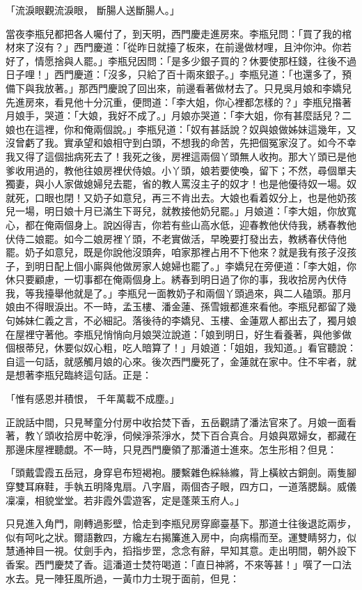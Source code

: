 「流淚眼觀流淚眼，  斷腸人送斷腸人。」

當夜李瓶兒都把各人囑付了，到天明，西門慶走進房來。李瓶兒問：「買了我的棺材來了沒有？」西門慶道：「從昨日就擡了板來，在前邊做材哩，且沖你沖。你若好了，情愿捨與人罷。」李瓶兒因問：「是多少銀子買的？休要使那枉錢，往後不過日子哩！」西門慶道：「沒多，只給了百十兩來銀子。」李瓶兒道：「也還多了，預備下與我放著。」那西門慶說了回出來，前邊看著做材去了。只見吳月娘和李嬌兒先進房來，看見他十分沉重，便問道：「李大姐，你心裡都怎樣的？」李瓶兒揝著月娘手，哭道：「大娘，我好不成了。」月娘亦哭道：「李大姐，你有甚麼話兒？二娘也在這裡，你和俺兩個說。」李瓶兒道：「奴有甚話說？奴與娘做姊妹這幾年，又沒曾虧了我。實承望和娘相守到白頭，不想我的命苦，先把個冤家沒了。如今不幸我又得了這個拙病死去了！我死之後，房裡這兩個丫頭無人收拘。那大丫頭已是他爹收用過的，教他往娘房裡伏侍娘。小丫頭，娘若要使喚，留下；不然，尋個單夫獨妻，與小人家做媳婦兒去罷，省的教人罵沒主子的奴才！也是他優待奴一場。奴就死，口眼也閉！又奶子如意兒，再三不肯出去。大娘也看着奴分上，也是他奶孩兒一場，明日娘十月已滿生下哥兒，就教接他奶兒罷。」月娘道：「李大姐，你放寬心，都在俺兩個身上。說凶得吉，你若有些山高水低，迎春教他伏侍我，綉春教他伏侍二娘罷。如今二娘房裡丫頭，不老實做活，早晚要打發出去，教綉春伏侍他罷。奶子如意兒，既是你說他沒頭奔，咱家那裡占用不下他來？就是我有孩子沒孩子，到明日配上個小廝與他做房家人媳婦也罷了。」李嬌兒在旁便道：「李大姐，你休只要顧慮，一切事都在俺兩個身上。綉春到明日過了你的事，我收拾房內伏侍我，等我擡舉他就是了。」李瓶兒一面教奶子和兩個丫頭過來，與二人磕頭。那月娘由不得眼淚出。不一時，孟玉樓、潘金蓮、孫雪娥都進來看他。李瓶兒都留了幾句姊妹仁義之言，不必細記。落後待的李嬌兒、玉樓、金蓮眾人都出去了，獨月娘在屋裡守著他。李瓶兒悄悄向月娘哭泣說道：「娘到明日，好生看養著，與他爹做個根蒂兒，休要似奴心粗，吃人暗算了！」月娘道：「姐姐，我知道。」看官聽說：自這一句話，就感觸月娘的心來。後次西門慶死了，金蓮就在家中。住不牢者，就是想著李瓶兒臨終這句話。正是：

「惟有感恩并積恨，  千年萬載不成塵。」

正說話中間，只見琴童分付房中收拾焚下香，五岳觀請了潘法官來了。月娘一面看著，教丫頭收拾房中乾淨，伺候淨茶淨水，焚下百合真合。月娘與眾婦女，都藏在那邊床屋裡聽覷。不一時，只見西門慶領了那潘道士進來。怎生形相？但見：

「頭戴雲霞五岳冠，身穿皂布短褐袍。腰繫雜色綵絲縧，背上橫紋古銅劍。兩隻腳穿雙耳麻鞋，手執五明降鬼扇。八字眉，兩個杏子眼，四方口，一道落腮鬍。威儀凜凜，相貌堂堂。若非霞外雲遊客，定是蓬萊玉府人。」

只見進入角門，剛轉過影壁，恰走到李瓶兒房穿廊臺基下。那道士往後退訖兩步，似有呵叱之狀。爾語數四，方纔左右揭簾進入房中，向病榻而至。運雙睛努力，似慧通神目一視。仗劍手內，搯指步罡，念念有辭，早知其意。走出明間，朝外設下香案。西門慶焚了香。這潘道士焚符喝道：「直日神將，不來等甚！」噀了一口法水去。見一陣狂風所過，一黃巾力士現于面前，但見：

